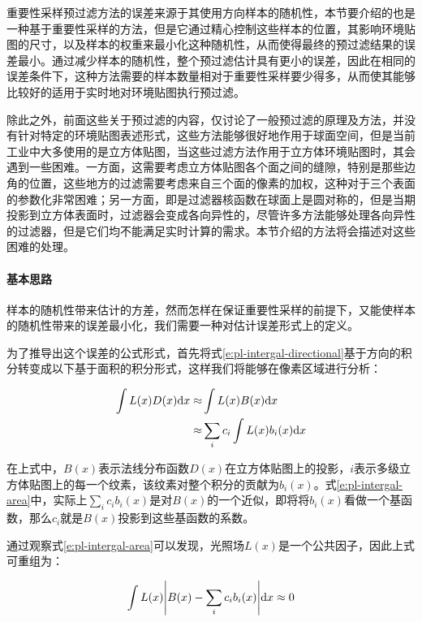 重要性采样预过滤方法的误差来源于其使用方向样本的随机性，本节要介绍的也是一种基于重要性采样的方法，但是它通过精心控制这些样本的位置，其影响环境贴图的尺寸，以及样本的权重来最小化这种随机性，从而使得最终的预过滤结果的误差最小。通过减少样本的随机性，整个预过滤估计具有更小的误差，因此在相同的误差条件下，这种方法需要的样本数量相对于重要性采样要少得多，从而使其能够比较好的适用于实时地对环境贴图执行预过滤。

除此之外，前面这些关于预过滤的内容，仅讨论了一般预过滤的原理及方法，并没有针对特定的环境贴图表述形式，这些方法能够很好地作用于球面空间，但是当前工业中大多使用的是立方体贴图，当这些过滤方法作用于立方体环境贴图时，其会遇到一些困难。一方面，这需要考虑立方体贴图各个面之间的缝隙，特别是那些边角的位置，这些地方的过滤需要考虑来自三个面的像素的加权，这种对于三个表面的参数化非常困难；另一方面，即是过滤器核函数在球面上是圆对称的，但是当期投影到立方体表面时，过滤器会变成各向异性的，尽管许多方法能够处理各向异性的过滤器，但是它们均不能满足实时计算的需求。本节介绍的方法将会描述对这些困难的处理。



\paragraph{基本思路}
样本的随机性带来估计的方差，然而怎样在保证重要性采样的前提下，又能使样本的随机性带来的误差最小化，我们需要一种对估计误差形式上的定义。

为了推导出这个误差的公式形式，首先将式\ref{e:pl-intergal-directional}基于方向的积分转变成以下基于面积的积分形式，这样我们将能够在像素区域进行分析：

\begin{equation}\label{e:pl-intergal-area}
\begin{aligned}
	\int L(x)D(x){\rm d}x\approx &\int L(x)B(x){\rm d}x\\
	\approx &\sum_i c_i\int L(x)b_i(x){\rm d}x
\end{aligned}
\end{equation}

在上式中，$B(x)$表示法线分布函数$D(x)$在立方体贴图上的投影，$i$表示多级立方体贴图上的每一个纹素，该纹素对整个积分的贡献为$b_i(x)$。式\ref{e:pl-intergal-area}中，实际上$\sum_i c_ib_i(x)$是对$B(x)$的一个近似，即将将$b_i(x)$看做一个基函数，那么$c_i$就是$B(x)$投影到这些基函数的系数。


通过观察式\ref{e:pl-intergal-area}可以发现，光照场$L(x)$是一个公共因子，因此上式可重组为：

\begin{equation}
	\int L(x)\Biggl| B(x)- \sum_i c_i b_i(x)\Biggl| {\rm d}x \approx 0
\end{equation}

